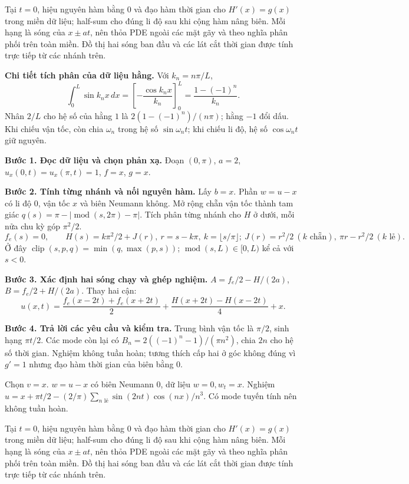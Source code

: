 Tại $t=0$, hiệu nguyên hàm bằng $0$ và đạo hàm thời gian cho $H'(x)=g(x)$ trong miền dữ liệu; half-sum cho đúng li độ sau khi cộng hàm nâng biên. Mỗi hạng là sóng của $x\pm at$, nên thỏa PDE ngoài các mặt gãy và theo nghĩa phân phối trên toàn miền. Đồ thị hai sóng ban đầu và các lát cắt thời gian được tính trực tiếp từ các nhánh trên.

\textbf{Chi tiết tích phân của dữ liệu hằng.} Với $k_n=n\pi/L$,
\[\int_0^L\sin k_nx\,dx=\left[-\frac{\cos k_nx}{k_n}\right]_0^L=\frac{1-(-1)^n}{k_n}.\]
Nhân $2/L$ cho hệ số của hằng $1$ là $2(1-(-1)^n)/(n\pi)$; hằng $-1$ đổi dấu. Khi chiếu vận tốc, còn chia $\omega_n$ trong hệ số $\sin\omega_nt$; khi chiếu li độ, hệ số $\cos\omega_nt$ giữ nguyên.

\textbf{Bước 1. Đọc dữ liệu và chọn phản xạ.} Đoạn $(0,\pi)$, $a=2$, $u_x(0,t)=u_x(\pi,t)=1$, $f=x$, $g=x$.

\textbf{Bước 2. Tính từng nhánh và nối nguyên hàm.} Lấy $b=x$. Phần $w=u-x$ có li độ $0$, vận tốc $x$ và biên Neumann không. Mở rộng chẵn vận tốc thành tam giác $q(s)=\pi-|\operatorname{mod}(s,2\pi)-\pi|$. Tích phân từng nhánh cho $H$ ở dưới, mỗi nửa chu kỳ góp $\pi^2/2$.
\[f_e(s)=0,\qquad H(s)=k\pi^2/2+J(r),\ r=s-k\pi,\ k=\lfloor s/\pi\rfloor;\ J(r)=r^2/2\ (k\text{ chẵn}),\ \pi r-r^2/2\ (k\text{ lẻ}).\]
Ở đây $\operatorname{clip}(s,p,q)=\min(q,\max(p,s))$; $\operatorname{mod}(s,L)\in[0,L)$ kể cả với $s<0$.

\textbf{Bước 3. Xác định hai sóng chạy và ghép nghiệm.} $A=f_e/2-H/(2a)$, $B=f_e/2+H/(2a)$. Thay hai cận:
\[u(x,t)=\frac{f_e(x-2t)+f_e(x+2t)}2+\frac{H(x+2t)-H(x-2t)}{4}+x.\]

\textbf{Bước 4. Trả lời các yêu cầu và kiểm tra.} Trung bình vận tốc là $\pi/2$, sinh hạng $\pi t/2$. Các mode còn lại có $B_n=2(( -1)^n-1)/(\pi n^2)$, chia $2n$ cho hệ số thời gian. Nghiệm không tuần hoàn; tương thích cấp hai ở góc không đúng vì $g'=1$ nhưng đạo hàm thời gian của biên bằng $0$.

Chọn $v=x$. $w=u-x$ có biên Neumann 0, dữ liệu $w=0,w_t=x$. Nghiệm $u=x+\pi t/2-(2/\pi)\sum_{n\text{ lẻ}}\sin(2nt)\cos(nx)/n^3$. Có mode tuyến tính nên không tuần hoàn.

Tại $t=0$, hiệu nguyên hàm bằng $0$ và đạo hàm thời gian cho $H'(x)=g(x)$ trong miền dữ liệu; half-sum cho đúng li độ sau khi cộng hàm nâng biên. Mỗi hạng là sóng của $x\pm at$, nên thỏa PDE ngoài các mặt gãy và theo nghĩa phân phối trên toàn miền. Đồ thị hai sóng ban đầu và các lát cắt thời gian được tính trực tiếp từ các nhánh trên.

